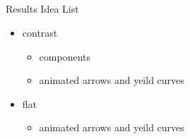 \documentclass[ xcolor = pdftex, dvipsnames, table ]{beamer}
\begin{document}
\subsection{}

\begin{frame}{\color{orange}Results Idea List}
\begin{itemize}
\item contrast
	\begin{itemize}
		\item components
		\item animated arrows and yeild curves
	\end{itemize}
\item flat
\begin{itemize}
	\item animated arrows and yeild curves
\end{itemize}
\end{itemize}
\end{frame}
\end{document}
